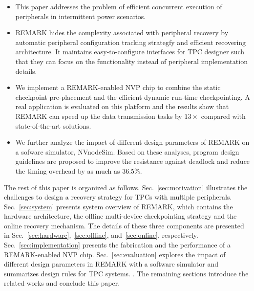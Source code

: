%
\begin{itemize}
    \item This paper addresses the problem of efficient concurrent execution of peripherals in intermittent power scenarios.

    \item REMARK hides the complexity associated with peripheral recovery by automatic peripheral configuration tracking strategfy and efficient recovering architecture. It maintains easy-to-configure interfaces for TPC designer such that they can focus on the functionality instead of peripheral implementation details. 

    \item We implement a REMARK-enabled NVP chip to combine the static checkpoint pre-placement and the efficient dynamic run-time checkpointing. A real application is evaluated on this platform and the results show that REMARK can speed up the data transmission tasks by $13\times$ compared with state-of-the-art solutions. 

    \item We further analyze the impact of different design parameters of REMARK on a sofware simulator, NVnodeSim. Based on these analyses, program design guidelines are proposed to improve the resistance against deadlock and reduce the timing overhead by as much as 36.5\%.
\end{itemize}

The rest of this paper is organized as follows.
Sec.~\ref{sec:motivation} illustrates the challenges to design a recovery strategy for TPCs with multiple peripherals.
Sec.~\ref{sec:system} presents system overview of REMARK, which contains the hardware architecture, the offline multi-device checkpointing strategy and the online recovery mechanism.
The details of these three components are presented in Sec.~\ref{sec:hardware},~\ref{sec:offline}, and~\ref{sec:online}, respectively. 
Sec.~\ref{sec:implementation} presents the fabrication and the performance of a REMARK-enabled NVP chip.
Sec.~\ref{sec:evaluation} explores the impact of different design parameters in REMARK with a software simulator and summarizes design rules for TPC systems. .
The remaining sections introduce the related works and conclude this paper.



%
%

